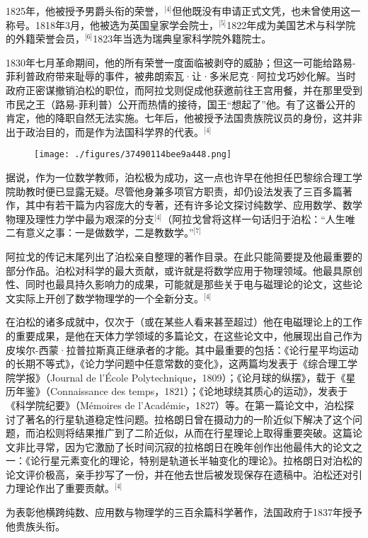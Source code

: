 1825年，他被授予男爵头衔的荣誉，\(^\text{[4]}\)但他既没有申请正式文凭，也未曾使用这一称号。1818年3月，他被选为英国皇家学会院士，\(^\text{[5]}\)1822年成为美国艺术与科学院的外籍荣誉会员，\(^\text{[6]}\)1823年当选为瑞典皇家科学院外籍院士。

1830年七月革命期间，他的所有荣誉一度面临被剥夺的威胁；但这一可能给路易-菲利普政府带来耻辱的事件，被弗朗索瓦·让·多米尼克·阿拉戈巧妙化解。当时政府正密谋撤销泊松的职位，而阿拉戈则促成他获邀前往王宫用餐，并在那里受到市民之王（路易-菲利普）公开而热情的接待，国王“想起了”他。有了这番公开的肯定，他的降职自然无法实施。七年后，他被授予法国贵族院议员的身份，这并非出于政治目的，而是作为法国科学界的代表。\(^\text{[4]}\)
\begin{figure}[ht]
\centering
\texttt{[image: ./figures/37490114bee9a448.png]}
\caption{} \label{fig_BSDN_1}
\end{figure}
据说，作为一位数学教师，泊松极为成功，这一点也许早在他担任巴黎综合理工学院助教时便已显露无疑。尽管他身兼多项官方职责，却仍设法发表了三百多篇著作，其中有若干篇为内容庞大的专著，还有许多论文探讨纯数学、应用数学、数学物理及理性力学中最为艰深的分支\(^\text{[4]}\)（阿拉戈曾将这样一句话归于泊松：“人生唯二有意义之事：一是做数学，二是教数学。”\(^\text{[7]}\)

阿拉戈的传记末尾列出了泊松亲自整理的著作目录。在此只能简要提及他最重要的部分作品。泊松对科学的最大贡献，或许就是将数学应用于物理领域。他最具原创性、同时也最具持久影响力的成果，可能就是那些关于电与磁理论的论文，这些论文实际上开创了数学物理学的一个全新分支。\(^\text{[4]}\)

在泊松的诸多成就中，仅次于（或在某些人看来甚至超过）他在电磁理论上的工作的重要成果，是他在天体力学领域的多篇论文，在这些论文中，他展现出自己作为皮埃尔-西蒙·拉普拉斯真正继承者的才能。其中最重要的包括：《论行星平均运动的长期不等式》，《论力学问题中任意常数的变化》，这两篇均发表于《综合理工学院学报》（Journal de l'École Polytechnique，1809）；《论月球的纵摆》，载于《星历年鉴》（Connaissance des temps，1821）；《论地球绕其质心的运动》，发表于《科学院纪要》（Mémoires de l'Académie，1827）等。在第一篇论文中，泊松探讨了著名的行星轨道稳定性问题。拉格朗日曾在摄动力的一阶近似下解决了这个问题，而泊松则将结果推广到了二阶近似，从而在行星理论上取得重要突破。这篇论文非比寻常，因为它激励了长时间沉寂的拉格朗日在晚年创作出他最伟大的论文之一：《论行星元素变化的理论，特别是轨道长半轴变化的理论》。拉格朗日对泊松的论文评价极高，亲手抄写了一份，并在他去世后被发现保存在遗稿中。泊松还对引力理论作出了重要贡献。\(^\text{[4]}\)

为表彰他横跨纯数、应用数与物理学的三百余篇科学著作，法国政府于1837年授予他贵族头衔。

